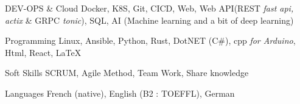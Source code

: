 

\begin{cvskills}

	\cvskill
	{DEV-OPS \& Cloud} %
	{Docker, K8S, Git, CICD, Web, Web API(REST \textit{fast api, actix} \& GRPC \textit{tonic}), SQL, AI (Machine learning and a bit of deep learning)} %

	\cvskill
	{Programming} %
	{Linux, Ansible, Python, Rust, DotNET (C\#), cpp \textit{for Arduino}, Html, React, LaTeX} %

	\cvskill
	{Soft Skills} %
	{SCRUM, Agile Method, Team Work, Share knowledge} %

	\cvskill
	{Languages} %
	{French (native), English (B2 : TOEFFL), German} %

\end{cvskills}
